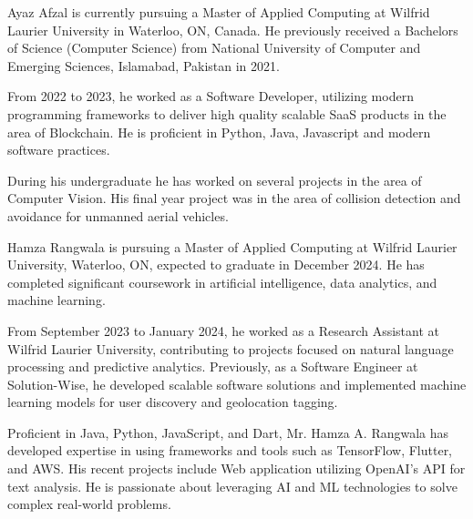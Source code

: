 \documentclass{ieeeaccess}
\begin{document}
\begin{IEEEbiography}{Ayaz Afzal} is currently pursuing a Master of Applied Computing at Wilfrid Laurier University in Waterloo, ON, Canada. He previously received a Bachelors of Science (Computer Science) from National University of Computer and Emerging Sciences, Islamabad, Pakistan  in 2021.
	
	From 2022 to 2023, he worked as a Software Developer,  utilizing modern programming frameworks to deliver high quality scalable SaaS products in the area of Blockchain. He is proficient in Python, Java, Javascript and modern software practices. 
	
	During his undergraduate he has worked on several projects in the area of Computer Vision. His final year project was in the area of collision detection and avoidance for unmanned aerial vehicles.
\end{IEEEbiography}


\begin{IEEEbiography}{Hamza Rangwala} is pursuing a Master of Applied Computing at Wilfrid Laurier University, Waterloo, ON, expected to graduate in December 2024. He has completed significant coursework in artificial intelligence, data analytics, and machine learning.
	
	From September 2023 to January 2024, he worked as a Research Assistant at Wilfrid Laurier University, contributing to projects focused on natural language processing and predictive analytics. Previously, as a Software Engineer at Solution-Wise, he developed scalable software solutions and implemented machine learning models for user discovery and geolocation tagging. 
	
	Proficient in Java, Python, JavaScript, and Dart, Mr. Hamza A. Rangwala has developed expertise in using frameworks and tools such as TensorFlow, Flutter, and AWS. His recent projects include Web application utilizing OpenAI's API for text analysis. He is passionate about leveraging AI and ML technologies to solve complex real-world problems.
\end{IEEEbiography}
\end{document}
